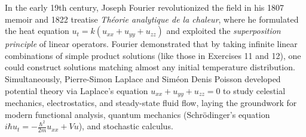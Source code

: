 \documentclass[11pt,a4paper]{article}
\begin{document}
In the early 19th century, Joseph Fourier revolutionized the field in his 1807 memoir and 1822 treatise \emph{Th\'{e}orie analytique de la chaleur}, where he formulated the heat equation $u_t = k(u_{xx} + u_{yy} + u_{zz})$ and exploited the \emph{superposition principle} of linear operators. Fourier demonstrated that by taking infinite linear combinations of simple product solutions (like those in Exercises 11 and 12), one could construct solutions matching almost any initial temperature distribution. Simultaneously, Pierre-Simon Laplace and Sim\'{e}on Denis Poisson developed potential theory via Laplace's equation $u_{xx} + u_{yy} + u_{zz} = 0$ to study celestial mechanics, electrostatics, and steady-state fluid flow, laying the groundwork for modern functional analysis, quantum mechanics (Schr\"{o}dinger's equation $i\hbar u_t = -\frac{\hbar^2}{2m}u_{xx} + Vu$), and stochastic calculus.
\end{document}
